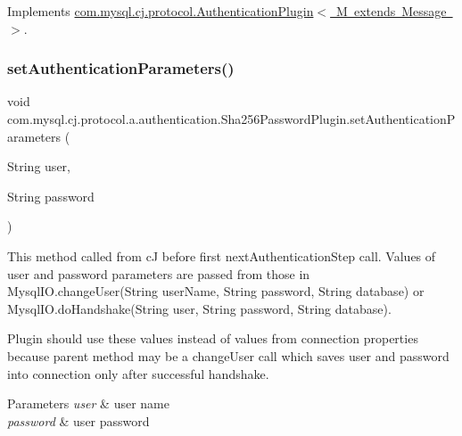 Implements \mbox{\hyperlink{interfacecom_1_1mysql_1_1cj_1_1protocol_1_1_authentication_plugin_a7dfc5f9b4c1e27d33982f8843254ee18}{com.\+mysql.\+cj.\+protocol.\+Authentication\+Plugin$<$ M extends Message $>$}}.

\mbox{\label{classcom_1_1mysql_1_1cj_1_1protocol_1_1a_1_1authentication_1_1_sha256_password_plugin_a3094a9ba3e8a9543ec5e4d89bbb23d47}} 
\subsubsection{\texorpdfstring{set\+Authentication\+Parameters()}{setAuthenticationParameters()}}
{\footnotesize\ttfamily void com.\+mysql.\+cj.\+protocol.\+a.\+authentication.\+Sha256\+Password\+Plugin.\+set\+Authentication\+Parameters (\begin{DoxyParamCaption}\item[{String}]{user,  }\item[{String}]{password }\end{DoxyParamCaption})}

This method called from cJ before first next\+Authentication\+Step call. Values of user and password parameters are passed from those in Mysql\+I\+O.\+change\+User(String user\+Name, String password, String database) or Mysql\+I\+O.\+do\+Handshake(String user, String password, String database).

Plugin should use these values instead of values from connection properties because parent method may be a change\+User call which saves user and password into connection only after successful handshake.


\begin{DoxyParams}{Parameters}
{\em user} & user name \\
\hline
{\em password} & user password \\
\hline
\end{DoxyParams}



